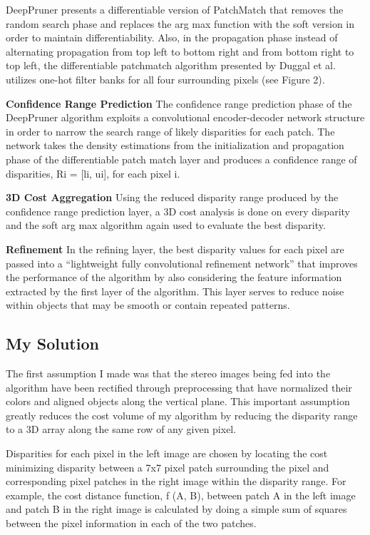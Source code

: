 \documentclass{article}
\begin{document}
DeepPruner presents a differentiable version of PatchMatch that removes the random search phase and replaces the arg max function with the soft version in order to maintain differentiability. Also, in the propagation phase instead of alternating propagation from top left to bottom right and from bottom right to top left, the differentiable patchmatch algorithm presented by Duggal et al. utilizes one-hot filter banks for all four surrounding pixels (see Figure 2).

\textbf{Confidence Range Prediction} The confidence range prediction phase of the DeepPruner algorithm exploits a convolutional encoder-decoder network structure in order to narrow the search range of likely disparities for each patch. The network takes the density estimations from the initialization and propagation phase of the differentiable patch match layer and produces a confidence range of disparities, Ri = [li, ui], for each pixel i.

\textbf{3D Cost Aggregation} Using the reduced disparity range produced by the confidence range prediction layer, a 3D cost analysis is done on every disparity and the soft arg max algorithm again used to evaluate the best disparity.

\textbf{Refinement} In the refining layer, the best disparity values for each pixel are passed into a “lightweight fully convolutional refinement network” that improves the performance of the algorithm by also considering the feature information extracted by the first layer of the algorithm.  This layer serves to reduce noise within objects that may be smooth or contain repeated patterns.

\subsection{My Solution}
The first assumption I made was that the stereo images being fed into the algorithm have been rectified through preprocessing that have normalized their colors and aligned objects along the vertical plane. This important assumption greatly reduces the cost volume of my algorithm by reducing the disparity range to a 3D array along the same row of any given pixel.

Disparities for each pixel in the left image are chosen by locating the cost minimizing disparity between a 7x7 pixel patch surrounding the pixel and corresponding pixel patches in the right image within the disparity range. For example, the cost distance function, f (A, B), between patch A in the left image and patch B in the right image is calculated by doing a simple sum of squares between the pixel information in each of the two patches.
\end{document}
